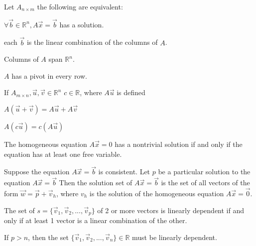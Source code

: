 \documentclass[5pt]{article}
\begin{document}
\begin{multicols}{2}
\begin{theorem}
  Let $A_{n\times m}$ the following are equivalent:
  \begin{itemize*}
    \item $\forall\vec{b}\in\mathbb{R}^n, A\vec{x}=\vec{b}$ has a solution.
    \item each $\vec{b}$ is the linear combination of the columns of $A$.
    \item Columns of $A$ span $\mathbb{R}^n$.
    \item $A$ has a pivot in every row.
  \end{itemize*}
\end{theorem}

\begin{theorem}
  If $A_{m\times n},\vec{u},\vec{v}\in\mathbb{R}^n$ $c\in\mathbb{R}$, where $A\vec{u}$ is defined\\
  \begin{itemize*}
    \item $A(\vec{u}+\vec{v})=A\vec{u}+A\vec{v}$
    \item $A(c\vec{u})=c(A\vec{u})$
  \end{itemize*}
\end{theorem}

\begin{theorem}
  The homogeneous equation $A\vec{x}=0$ has a nontrivial solution if and only if the equation has at least
  one free variable.
\end{theorem}

\begin{theorem}
  Suppose the equation $A\vec{x}=\vec{b}$ is consistent. Let $p$ be a particular solution to the equation $A\vec{x}=\vec{b}$ 
  Then the solution set of $A\vec{x}=\vec{b}$ is the set of all vectors of the form $\vec{w}=\vec{p}+\vec{v}_h$,
  where $v_h$ is the solution of the homogeneous equation $A\vec{x}=\vec{0}$.
\end{theorem}

\begin{theorem}
  The set of  $s=\{\vec{v}_1,\vec{v}_2, ... ,\vec{v}_p\}$ of 2 or more vectors is linearly dependent if and only if at least 1 vector is a linear combination of the other.
\end{theorem}

\begin{theorem}
  If $p>n$, then the set $\{\vec{v}_1, \vec{v}_2, ..., \vec{v}_n\}\in\mathbb{R}$ must be linearly dependent.
\end{theorem}


\end{multicols}
\end{document}
